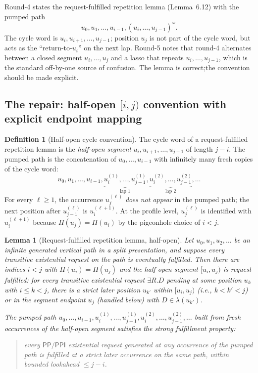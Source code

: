 \documentclass[11pt]{article}
\newtheorem{lemma}[theorem]{Lemma}
\theoremstyle{definition}
\newtheorem{definition}[theorem]{Definition}
\theoremstyle{remark}
\newcommand{\PP}{\mathsf{PP}}
\newcommand{\PPI}{\mathsf{PPI}}
\begin{document}
Round-4 \cite{GPT55Repaired} states the request-fulfilled
repetition lemma (Lemma~6.12) with the pumped path
\[
  u_0,u_1,\ldots,u_{i-1},(u_i,\ldots,u_{j-1})^\omega.
\]
The cycle word is $u_i,u_{i+1},\ldots,u_{j-1}$; position $u_j$ is
not part of the cycle word, but acts as the ``return-to-$u_i$'' on
the next lap.  Round-5 \cite{GPT55Round5Review} notes that
round-4 alternates between a closed segment $u_i,\ldots,u_j$ and a
lasso that repeats $u_i,\ldots,u_{j-1}$, which is the standard
off-by-one source of confusion.  The lemma is correct;\@ the
convention should be made explicit.

\subsection{The repair: half-open $[i,j)$ convention with explicit endpoint mapping}

\begin{definition}[Half-open cycle convention]\label{def:half-open}
The cycle word of a request-fulfilled repetition lemma is the
\emph{half-open segment} $u_i,u_{i+1},\ldots,u_{j-1}$ of length
$j-i$.  The pumped path is the concatenation of $u_0,\ldots,u_{i-1}$
with infinitely many fresh copies of the cycle word:
\[
  u_0,u_1,\ldots,u_{i-1},
  \underbrace{u_i^{(1)},\ldots,u_{j-1}^{(1)}}_{\text{lap }1},
  \underbrace{u_i^{(2)},\ldots,u_{j-1}^{(2)}}_{\text{lap }2},
  \ldots
\]
For every $\ell\geq 1$, the occurrence $u_j^{(\ell)}$ \emph{does
not appear} in the pumped path; the next position after
$u_{j-1}^{(\ell)}$ is $u_i^{(\ell+1)}$.  At the profile level,
$u_j^{(\ell)}$ is identified with $u_i^{(\ell+1)}$ because
$\Pi(u_j)=\Pi(u_i)$ by the pigeonhole choice of $i<j$.
\end{definition}

\begin{lemma}[Request-fulfilled repetition lemma, half-open]\label{lem:request-cycle-v3}
Let $u_0,u_1,u_2,\ldots$ be an infinite generated vertical path in
a split presentation, and suppose every transitive existential
request on the path is eventually fulfilled.  Then there are
indices $i<j$ with $\Pi(u_i)=\Pi(u_j)$ and the half-open segment
$[u_i,u_j)$ is \emph{request-fulfilled}: for every transitive
existential request $\exists R.D$ pending at some position $u_k$
with $i\leq k<j$, there is a strict later position $u_{k'}$ within
$[u_i,u_j)$ (i.e., $k<k'<j$) or in the segment endpoint $u_j$
(handled below) with $D\in\lambda(u_{k'})$.

The pumped path
$u_0,\ldots,u_{i-1},u_i^{(1)},\ldots,u_{j-1}^{(1)},
u_i^{(2)},\ldots,u_{j-1}^{(2)},\ldots$ built from fresh
occurrences of the half-open segment satisfies the strong
fulfillment property:
\begin{quote}
every $\PP/\PPI$ existential request generated at any occurrence
of the pumped path is fulfilled at a strict later occurrence on
the same path, within bounded lookahead $\leq j-i$.
\end{quote}
\end{lemma}
\end{document}
